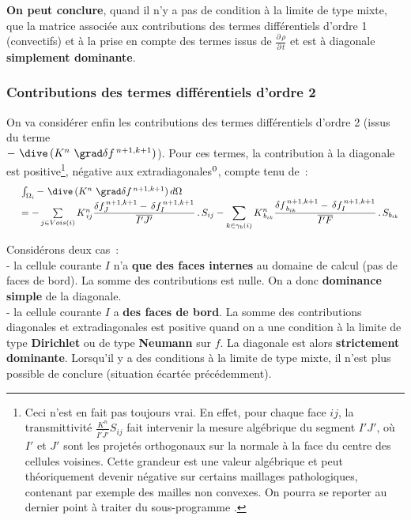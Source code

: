 {\bf On peut conclure}, quand il n'y a pas de condition à la limite de type mixte,
que la matrice associée aux contributions des termes
différentiels d'ordre 1 (convectifs) et à la prise en compte des termes
issus de $\displaystyle \frac{{\partial}\,\rho}{{\partial}\,t}$ et est à
diagonale {\bf simplement dominante}.




\subsubsection*{Contributions des termes différentiels d'ordre 2}

On va considérer enfin les contributions des termes différentiels
d'ordre 2 (issus du terme \\
$-\ \dive\,(K^n\ \grad \delta f^{\,n+1,k+1})$).
Pour ces termes, la contribution  à la
diagonale est positive\footnote{\label{Base_Covofi_transmittivite}Ceci n'est en fait pas
toujours
vrai. En effet, pour chaque face $ij$, la transmittivité
$\frac{K^n}{\overline{I'J'}}S_{ij}$
fait intervenir la mesure algébrique du segment $I'J'$, où $I'$ et $J'$
sont les projetés orthogonaux sur la normale à la face du centre
des cellules voisines. Cette
grandeur est une valeur algébrique et peut théoriquement devenir
négative sur certains maillages pathologiques, contenant par exemple des
mailles non convexes. On pourra se reporter au dernier point à traiter du sous-programme
.},
négative aux extradiagonales$^{\text{\scriptsize \thefootnote}}$, compte tenu de~:
\begin{equation}
\begin{array}{ll}
&\int_{\Omega_i}-\ \dive\,(K^n\ \grad \delta f^{\,n+1,k+1})\,d\Omega\\
&= -\sum\limits_{j \in Vois(i)} K_{\,ij}^n
\displaystyle \frac{\delta f_{J}^{\,n+1,k+1} -\,\delta f_{I}^{\,n+1,k+1}}{\overline{I'J'}}\,.\,S_{ij}
-\sum\limits_{k \in \gamma_b(i)} K_{\,b_{ik}}^n
\displaystyle\frac{\delta f_{\,b_{ik}}^{\,n+1,k+1} -\,\delta f_{I}^{\,n+1,k+1}}{\overline{I'F}}\,.\,
S_{b_{ik}}
\end{array}
\end{equation}



Considérons deux cas~:\\
\hspace*{1cm}- la cellule courante $I$ n'a {\bf que des faces internes} au domaine de
calcul (pas de faces de bord). La somme des contributions est nulle. On a donc
{\bf dominance simple} de la diagonale. \\
\hspace*{1cm}- la cellule courante $I$ a  {\bf des faces de bord}.  La somme des
contributions diagonales et extradiagonales est positive quand on a une
condition à la limite de type {\bf Dirichlet} ou de type {\bf Neumann} sur $f$. La
diagonale est alors {\bf strictement dominante}.
Lorsqu'il y a des conditions à la limite de type mixte, il n'est plus possible
de conclure (situation écartée précédemment).\\

